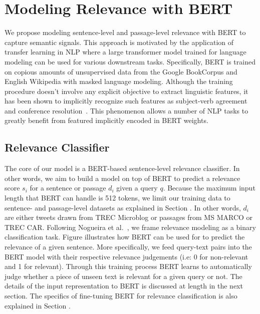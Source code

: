\section{Modeling Relevance with BERT}

We propose modeling sentence-level and passage-level relevance with BERT to capture semantic signals.
This approach is motivated by the application of transfer learning in NLP where a large transformer model trained for language modeling can be used for various downstream tasks.
Specifically, BERT is trained on copious amounts of unsupervised data from the Google BookCorpus and English Wikipedia with masked language modeling.
Although the training procedure doesn't involve any explicit objective to extract linguistic features, it has been shown to implicitly recognize such features as subject-verb agreement and conference resolution~\cite{jawahar2019does, clark2019does}.
This phenomenon allows a number of NLP tasks to greatly benefit from featured implicitly encoded in BERT weights.

\subsection{Relevance Classifier}

The core of our model is a BERT-based sentence-level relevance classifier.
In other words, we aim to build a model on top of BERT to predict a relevance score $ s_i $ for a sentence or passage $ d_i $ given a query $ q $.
Because the maximum input length that BERT can handle is 512 tokens, we limit our training data to sentence- and passage-level datasets as explained in Section .
In other words, $ d_i $ are either tweets drawn from TREC Microblog or passages from MS MARCO or TREC CAR.
Following Nogueira et al.~\cite{nogueira2019passage}, we frame relevance modeling as a binary classification task.
Figure  illustrates how BERT can be used for to predict the relevance of a given sentence.
More specifically, we feed query-text pairs into the BERT model with their respective relevance judgements (i.e: 0 for non-relevant and 1 for relevant).
Through this training process BERT learns to automatically judge whether a piece of unseen text is relevant for a given query or not.
The details of the input representation to BERT is discussed at length in the next section.
The specifics of fine-tuning BERT for relevance classification is also explained in Section .

